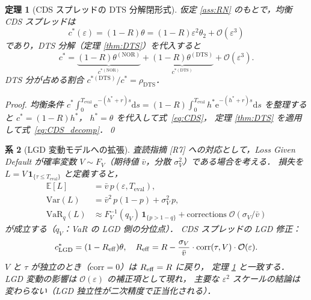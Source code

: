 \documentclass[12pt,a4paper]{article}
\theoremstyle{plain}
\newtheorem{theorem}{定理}[section]
\newtheorem{corollary}[theorem]{系}
\theoremstyle{definition}
\theoremstyle{remark}
\newcommand{\bE}{\mathbb{E}}
\newcommand{\calO}{\mathcal{O}}
\newcommand{\eps}{\varepsilon}
\newcommand{\e}{\mathrm{e}}
\newcommand{\VaR}{\mathrm{VaR}}
\newcommand{\dd}{\mathrm{d}}
\newcommand{\thetaNOR}{\theta^{(\mathrm{NOR})}}
\newcommand{\thetaDTS}{\theta^{(\mathrm{DTS})}}
\newcommand{\rhoDTS}{\rho_{\mathrm{DTS}}}
\newcommand{\Teval}{T_{\mathrm{eval}}}
\begin{document}
\begin{theorem}[CDS スプレッドの DTS 分解閉形式]\label{thm:CDS}
  仮定 \ref{ass:RN} のもとで，均衡 CDS スプレッドは
  \begin{equation}\label{eq:CDS}
    c^*(\eps) = (1-R)\theta = (1-R)\eps^2\theta_2+\calO(\eps^3)
  \end{equation}
  であり，DTS 分解（定理 \ref{thm:DTS}）を代入すると
  \begin{equation}\label{eq:CDS_decomp}
    c^* = \underbrace{(1-R)\thetaNOR}_{c^{*(\mathrm{NOR})}}
        + \underbrace{(1-R)\thetaDTS}_{c^{*(\mathrm{DTS})}} + \calO(\eps^3).
  \end{equation}
  DTS 分が占める割合 $c^{*(\mathrm{DTS})}/c^* = \rhoDTS$．

  \begin{proof}
    均衡条件 $c^*\int_0^{\Teval}\e^{-(h^*+r)s}\dd s
    = (1-R)\int_0^{\Teval} h^*\e^{-(h^*+r)s}\dd s$ を整理すると $c^*=(1-R)h^*$，
    $h^*=\theta$ を代入して式~\eqref{eq:CDS}，
    定理 \ref{thm:DTS} を適用して式~\eqref{eq:CDS_decomp}．\qed
  \end{proof}
\end{theorem}

\begin{corollary}[LGD 変動モデルへの拡張]\label{cor:LGD}
  査読指摘 [R7] への対応として，Loss Given Default が確率変数
  $V\sim F_V$（期待値 $\bar{v}$，分散 $\sigma_V^2$）である場合を考える．
  損失を $L = V\,\mathbf{1}_{\{\tau\le\Teval\}}$ と定義すると，
  \begin{align}
    \bE[L] &= \bar{v}\,p(\eps,\Teval),
    \label{eq:EL_LGD}\\
    \mathrm{Var}(L) &= \bar{v}^2\,p(1-p) + \sigma_V^2\,p,
    \label{eq:VarL_LGD}\\
    \VaR_q(L) &\approx F_V^{-1}(q_V)\,\mathbf{1}_{\{p>1-q\}}
              + \mathrm{corrections}\;\calO(\sigma_V/\bar{v})
    \label{eq:VaR_LGD}
  \end{align}
  が成立する（$q_V$：VaR の LGD 側の分位点）．
  CDS スプレッドの LGD 修正：
  \begin{equation}
    c^*_{\mathrm{LGD}}
    = (1-R_{\rm eff})\theta,\quad
    R_{\rm eff} = R - \frac{\sigma_V}{\bar{v}}\cdot\mathrm{corr}(\tau, V)\cdot\calO(\eps).
  \end{equation}
  $V$ と $\tau$ が独立のとき（$\mathrm{corr}=0$）は $R_{\rm eff}=R$ に戻り，
  定理 \ref{thm:CDS} と一致する．
  LGD 変動の影響は $\calO(\eps)$ の補正項として現れ，
  主要な $\eps^2$ スケールの結論は変わらない（LGD 独立性が二次精度で正当化される）．
\end{corollary}
\end{document}
